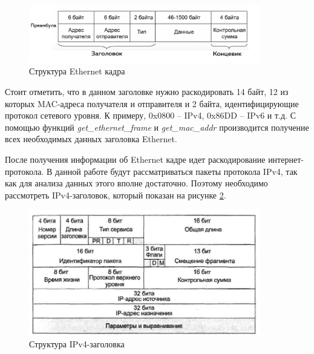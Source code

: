 \documentclass[bachelor, och, coursework]{SCWorks}
\begin{document}
    \begin{figure}[H]
      \centering
      \includegraphics[width=0.9\textwidth]{photo/eth-frame.jpg}
      \caption{Структура Ethernet кадра}
      \label{eth-frame}
    \end{figure}
    
    Стоит отметить, что в данном заголовке нужно раскодировать 14 байт, 12 из которых MAC-адреса получателя и отправителя и 2 байта, идентифицирующие протокол
    сетевого уровня. К примеру, 0x0800 -- IPv4, 0x86DD -- IPv6 и т.д. С помощью функций \textit{get\_ethernet\_frame} и \textit{get\_mac\_addr} производится получение всех необходимых
    данных заголовка Ethernet.
    
      
      

    После получения информации об Ethernet кадре идет раскодирование интернет-протокола. В данной работе будут рассматриваться пакеты протокола IPv4, 
    так как для анализа данных этого вполне достаточно. Поэтому необходимо рассмотреть IPv4-заголовок, который показан на рисунке \ref{ipv4-header}.

    \begin{figure}[H]
      \centering
      \includegraphics[width=0.9\textwidth]{photo/ipv4-header.jpg}
      \caption{Структура IPv4-заголовка}
      \label{ipv4-header}
    \end{figure}
      
\end{document}

